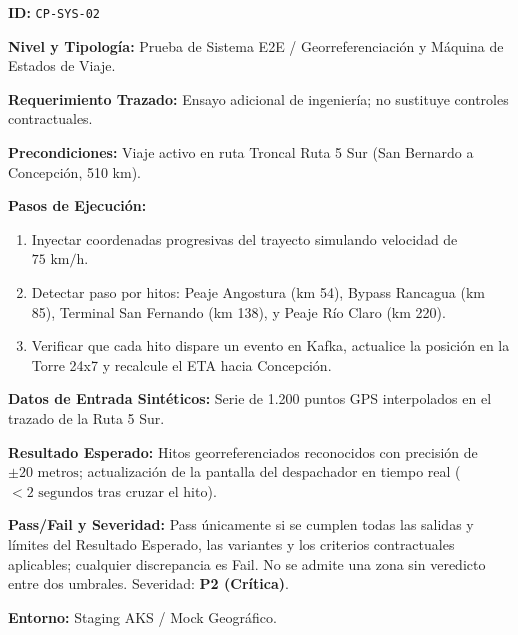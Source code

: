 \par\noindent\textbf{ID:} \texttt{C\allowbreak{}P\allowbreak{}-\allowbreak{}S\allowbreak{}Y\allowbreak{}S\allowbreak{}-\allowbreak{}0\allowbreak{}2\allowbreak{}}\par
\par\noindent\textbf{Nivel y Tipología:} Prueba de Sistema E2E / Georreferenciación y Máquina de Estados de Viaje.\par
\par\noindent\textbf{Requerimiento Trazado:} Ensayo adicional de ingeniería; no sustituye controles contractuales.\par
\par\noindent\textbf{Precondiciones:} Viaje activo en ruta Troncal Ruta 5 Sur (San Bernardo a Concepción, 510 km).\par
\par\noindent\textbf{Pasos de Ejecución:} \par
\begin{enumerate}
\item Inyectar coordenadas progresivas del trayecto simulando velocidad de \(75\text{ km/h}\).
\item Detectar paso por hitos: Peaje Angostura (km 54), Bypass Rancagua (km 85), Terminal San Fernando (km 138), y Peaje Río Claro (km 220).
\item Verificar que cada hito dispare un evento en Kafka, actualice la posición en la Torre 24x7 y recalcule el ETA hacia Concepción.
\end{enumerate}
\par\noindent\textbf{Datos de Entrada Sintéticos:} Serie de 1.200 puntos GPS interpolados en el trazado de la Ruta 5 Sur.\par
\par\noindent\textbf{Resultado Esperado:} Hitos georreferenciados reconocidos con precisión de \(\pm 20\text{ metros}\); actualización de la pantalla del despachador en tiempo real (\(< 2\text{ segundos}\) tras cruzar el hito).\par
\par\noindent\textbf{Pass/Fail y Severidad:} Pass únicamente si se cumplen todas las salidas y límites del Resultado Esperado, las variantes y los criterios contractuales aplicables; cualquier discrepancia es Fail. No se admite una zona sin veredicto entre dos umbrales. Severidad: \textbf{P2 (Crítica)}.\par
\par\noindent\textbf{Entorno:} Staging AKS / Mock Geográfico.\par






